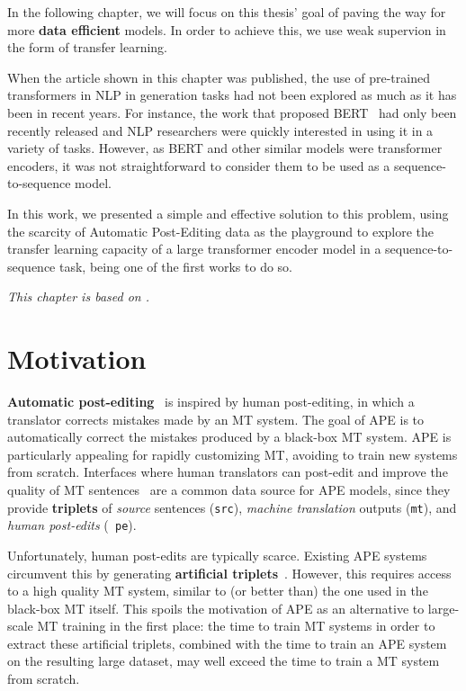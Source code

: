\label{cap:ape}

In the following chapter, we will focus on this thesis' goal of
paving the way for more \textbf{data efficient} models. In order to
achieve this, we use weak supervion in the form of transfer learning.

When the article shown in this chapter was published, the use of
pre-trained transformers %
in NLP in generation tasks had not been explored as much as it has
been in recent years. %
For instance, the work that proposed
BERT~\citep{devlin2018bert} had only been recently released and NLP
researchers were quickly interested in using it in a variety of
tasks. However, as BERT and other similar models were transformer
encoders, it was not straightforward to consider them to be used
as a sequence-to-sequence model. %

In this work, we presented a simple and effective
solution to this problem, using the scarcity of Automatic Post-Editing
data as the playground to explore the transfer learning capacity of a
large transformer encoder model in a sequence-to-sequence task,
being one of the first works to do so.

\emph{This chapter is based on \citet{Correia2019}.}

\section{Motivation}

 {\bf Automatic post-editing}~\citep[APE;][]{simard2007rule} is
inspired by human post-editing, in which a translator corrects
mistakes made by an MT system.
The goal of APE is to automatically correct the mistakes produced by
a black-box MT system. APE is particularly
appealing for rapidly customizing MT, avoiding to train new systems
from scratch. Interfaces where human translators can post-edit and
improve the quality of MT
sentences~\citep{Alabau2014,Federico2014,Denkowski2015,Hokamp2018}
are a common data source for APE models, since they provide {\bf
    triplets} of {\it source} sentences ({\tt src}), {\it machine
    translation} outputs ({\tt mt}), and {\it human post-edits} ({\tt
    pe}).

Unfortunately, human post-edits are typically scarce. Existing APE
systems circumvent this by generating {\bf artificial
    triplets}~\citep{junczys2016log, negri2018escape}. However, this
requires access to a high quality MT system, similar to (or better
than) the one used in the black-box MT itself. This spoils the
motivation of APE as an alternative to large-scale MT training in the
first place: the time to train MT systems in order to extract these
artificial triplets, combined with the time to train an APE system on
the resulting large dataset, may well exceed the time to train a MT
system from scratch.

